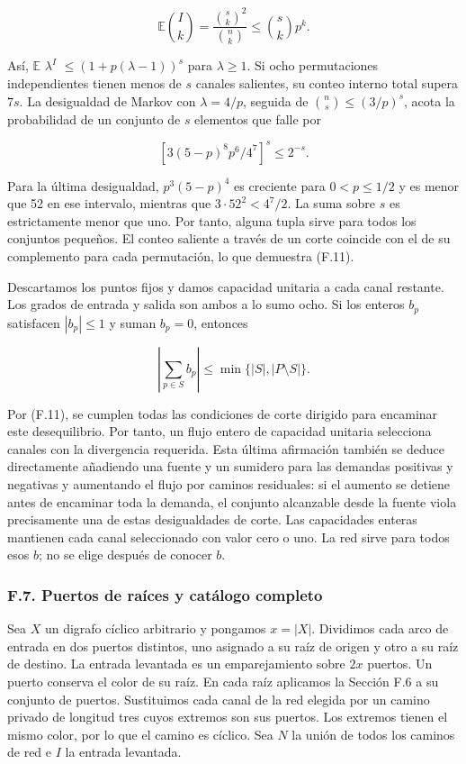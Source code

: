 \documentclass[spanish,11pt,a4paper]{article}
\begin{document}
\[\mathbb E\binom Ik=\frac{\binom sk^2}{\binom nk}\le\binom skp^k.\]

Así, \(\mathbb E\) \(\lambda^{I}\) \(\le (1+p(\lambda-1))^{s}\) para \(\lambda\ge 1\). Si ocho permutaciones independientes tienen menos de \(s\) canales salientes, su conteo interno total supera \(7s\). La desigualdad de Markov con \(\lambda=4/p\), seguida de \(\binom{n}{s}\le (3/p)^{s}\), acota la probabilidad de un conjunto de \(s\) elementos que falle por

\[\left[3(5-p)^8p^6/4^7\right]^s\le2^{-s}.\]

Para la última desigualdad, \(p^{3}(5-p)^{4}\) es creciente para \(0<p\le 1/2\) y es menor que 52 en ese intervalo, mientras que \(3\cdot 52^{2}<4^{7}/2\). La suma sobre \(s\) es estrictamente menor que uno. Por tanto, alguna tupla sirve para todos los conjuntos pequeños. El conteo saliente a través de un corte coincide con el de su complemento para cada permutación, lo que demuestra (F.11).

Descartamos los puntos fijos y damos capacidad unitaria a cada canal restante. Los grados de entrada y salida son ambos a lo sumo ocho. Si los enteros \(b_{p}\) satisfacen \(|b_{p}|\le 1\) y suman \(b_{p}=0\), entonces

\[\left|\sum_{p\in S}b_p\right|\le\min\{|S|,|P\setminus S|\}.\]

Por (F.11), se cumplen todas las condiciones de corte dirigido para encaminar este desequilibrio. Por tanto, un flujo entero de capacidad unitaria selecciona canales con la divergencia requerida. Esta última afirmación también se deduce directamente añadiendo una fuente y un sumidero para las demandas positivas y negativas y aumentando el flujo por caminos residuales: si el aumento se detiene antes de encaminar toda la demanda, el conjunto alcanzable desde la fuente viola precisamente una de estas desigualdades de corte. Las capacidades enteras mantienen cada canal seleccionado con valor cero o uno. La red sirve para todos esos \(b\); no se elige después de conocer \(b\).

\subsubsection{F.7. Puertos de raíces y catálogo completo}\label{f.7.-puertos-de-rauxedces-y-catuxe1logo-completo}

Sea \(X\) un digrafo cíclico arbitrario y pongamos \(x=|X|\). Dividimos cada arco de entrada en dos puertos distintos, uno asignado a su raíz de origen y otro a su raíz de destino. La entrada levantada es un emparejamiento sobre \(2x\) puertos. Un puerto conserva el color de su raíz. En cada raíz aplicamos la Sección F.6 a su conjunto de puertos. Sustituimos cada canal de la red elegida por un camino privado de longitud tres cuyos extremos son sus puertos. Los extremos tienen el mismo color, por lo que el camino es cíclico. Sea \(N\) la unión de todos los caminos de red e \(I\) la entrada levantada.
\end{document}

